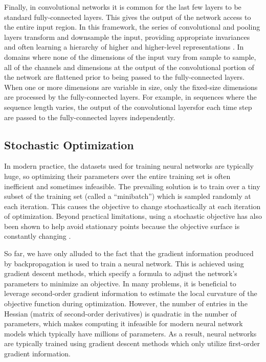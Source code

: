Finally, in convolutional networks it is common for the last few layers to be standard fully-connected layers.
This gives the output of the network access to the entire input region.
In this framework, the series of convolutional and pooling layers transform and downsample the input, providing appropriate invariances and often learning a hierarchy of higher and higher-level representations \cite{}.
In domains where none of the dimensions of the input vary from sample to sample, all of the channels and dimensions at the output of the convolutional portion of the network are flattened prior to being passed to the fully-connected layers.
When one or more dimensions are variable in size, only the fixed-size dimensions are processed by the fully-connected layers.
For example, in sequences where the sequence length varies, the output of the convolutional layersfor each time step are passed to the fully-connected layers independently.

\subsection{Stochastic Optimization}

In modern practice, the datasets used for training neural networks are typically huge, so optimizing their parameters over the entire training set is often inefficient and sometimes infeasible.
The prevailing solution is to train over a tiny subset of the training set (called a ``minibatch'') which is sampled randomly at each iteration.
This causes the objective to change stochastically at each iteration of optimization.
Beyond practical limitations, using a stochastic objective has also been shown to help avoid stationary points because the objective surface is constantly changing \cite{}.

So far, we have only alluded to the fact that the gradient information produced by backpropagation is used to train a neural network.
This is achieved using gradient descent methods, which specify a formula to adjust the network's parameters to minimize an objective.
In many problems, it is beneficial to leverage second-order gradient information to estimate the local curvature of the objective function during optimization.
However, the number of entries in the Hessian (matrix of second-order derivatives) is quadratic in the number of parameters, which makes computing it infeasible for modern neural network models which typically have millions of parameters.
As a result, neural networks are typically trained using gradient descent methods which only utilize first-order gradient information.

